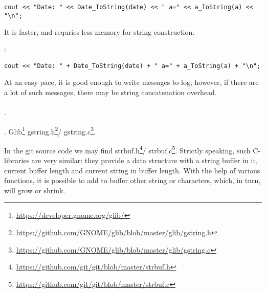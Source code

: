 \begin{lstlisting}
cout << "Date: " << Date_ToString(date) << " a=" << a_ToString(a) << "\n";
\end{lstlisting}

{It is faster, and requries less memory for string construction}.

:

\begin{lstlisting}
cout << "Date: " + Date_ToString(date) + " a=" + a_ToString(a) + "\n";
\end{lstlisting}

{At an easy pace, it is good enough to write messages to log, however, if there are a lot
of such messages, there may be string concatenation overhead}. \\
\\
.

.
 Glib\footnote{\url{https://developer.gnome.org/glib/}} 
gstring.h\footnote{\url{https://github.com/GNOME/glib/blob/master/glib/gstring.h}}/
gstring.c\footnote{\url{https://github.com/GNOME/glib/blob/master/glib/gstring.c}}. 

\label{strbuf}
{In the git source code we may find} strbuf.h\footnote{\url{https://github.com/git/git/blob/master/strbuf.h}}/
strbuf.c\footnote{\url{https://github.com/git/git/blob/master/strbuf.c}}. 
{Strictly speaking, such C-libraries are very similar: they provide a data structure with a string buffer
in it, current buffer length and current string in buffer length}.
{With the help of various functions, it is possible to add to buffer other string or characters,
which, in turn, will grow or shrink}.

